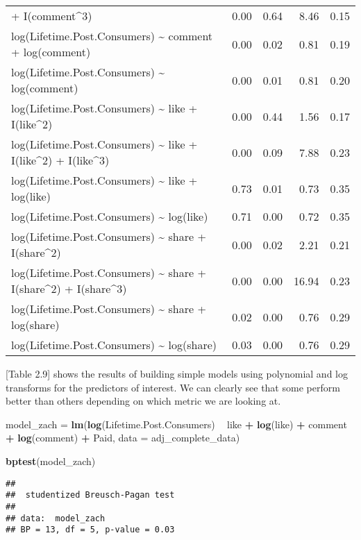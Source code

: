 \documentclass[
]{article}
\newenvironment{Shaded}{\begin{snugshade}}{\end{snugshade}}
\newcommand{\DataTypeTok}[1]{\textcolor[rgb]{0.13,0.29,0.53}{#1}}
\newcommand{\KeywordTok}[1]{\textcolor[rgb]{0.13,0.29,0.53}{\textbf{#1}}}
\newcommand{\NormalTok}[1]{#1}
\newcommand{\OperatorTok}[1]{\textcolor[rgb]{0.81,0.36,0.00}{\textbf{#1}}}
\newcommand{\StringTok}[1]{\textcolor[rgb]{0.31,0.60,0.02}{#1}}
\begin{document}
\begin{longtable}[]{@{}lrrrr@{}}
+ I(comment\^{}3) & 0.00 & 0.64 & 8.46 & 0.15\tabularnewline
log(Lifetime.Post.Consumers) \textasciitilde{} comment + log(comment) &
0.00 & 0.02 & 0.81 & 0.19\tabularnewline
log(Lifetime.Post.Consumers) \textasciitilde{} log(comment) & 0.00 &
0.01 & 0.81 & 0.20\tabularnewline
log(Lifetime.Post.Consumers) \textasciitilde{} like + I(like\^{}2) &
0.00 & 0.44 & 1.56 & 0.17\tabularnewline
log(Lifetime.Post.Consumers) \textasciitilde{} like + I(like\^{}2) +
I(like\^{}3) & 0.00 & 0.09 & 7.88 & 0.23\tabularnewline
log(Lifetime.Post.Consumers) \textasciitilde{} like + log(like) & 0.73 &
0.01 & 0.73 & 0.35\tabularnewline
log(Lifetime.Post.Consumers) \textasciitilde{} log(like) & 0.71 & 0.00 &
0.72 & 0.35\tabularnewline
log(Lifetime.Post.Consumers) \textasciitilde{} share + I(share\^{}2) &
0.00 & 0.02 & 2.21 & 0.21\tabularnewline
log(Lifetime.Post.Consumers) \textasciitilde{} share + I(share\^{}2) +
I(share\^{}3) & 0.00 & 0.00 & 16.94 & 0.23\tabularnewline
log(Lifetime.Post.Consumers) \textasciitilde{} share + log(share) & 0.02
& 0.00 & 0.76 & 0.29\tabularnewline
log(Lifetime.Post.Consumers) \textasciitilde{} log(share) & 0.03 & 0.00
& 0.76 & 0.29\tabularnewline
\bottomrule
\end{longtable}

{[}Table 2.9{]} shows the results of building simple models using
polynomial and log transforms for the predictors of interest. We can
clearly see that some perform better than others depending on which
metric we are looking at.

\begin{Shaded}
\begin{Highlighting}[]
\NormalTok{model_zach =}\StringTok{ }\KeywordTok{lm}\NormalTok{(}\KeywordTok{log}\NormalTok{(Lifetime.Post.Consumers) }\OperatorTok{~}\StringTok{ }\NormalTok{like }\OperatorTok{+}\StringTok{ }\KeywordTok{log}\NormalTok{(like) }\OperatorTok{+}\StringTok{ }\NormalTok{comment }\OperatorTok{+}\StringTok{ }\KeywordTok{log}\NormalTok{(comment) }\OperatorTok{+}\StringTok{ }
\StringTok{    }\NormalTok{Paid, }\DataTypeTok{data =}\NormalTok{ adj_complete_data)}

\KeywordTok{bptest}\NormalTok{(model_zach)}
\end{Highlighting}
\end{Shaded}

\begin{verbatim}
## 
##  studentized Breusch-Pagan test
## 
## data:  model_zach
## BP = 13, df = 5, p-value = 0.03
\end{verbatim}
\end{document}

